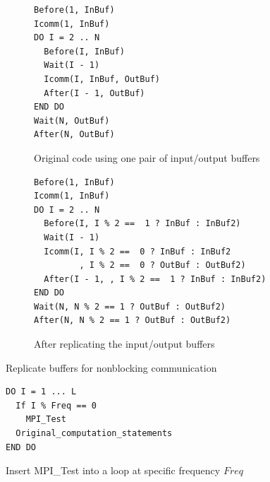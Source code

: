 \begin{figure}
{\scriptsize
  \centering
  \begin{subfigure}[b]{.4\textwidth}
\begin{verbatim}
Before(1, InBuf)
Icomm(1, InBuf)
DO I = 2 .. N
  Before(I, InBuf)
  Wait(I - 1)
  Icomm(I, InBuf, OutBuf)
  After(I - 1, OutBuf)
END DO
Wait(N, OutBuf)
After(N, OutBuf)
\end{verbatim}
    \caption{Original code using one pair of input/output buffers}
    \label{fig:cco:dup:a}
  \end{subfigure}
  \vspace{.01in}
  \begin{subfigure}[b]{.4\textwidth}
\begin{verbatim}
Before(1, InBuf)
Icomm(1, InBuf)
DO I = 2 .. N
  Before(I, I % 2 ==  1 ? InBuf : InBuf2)
  Wait(I - 1)
  Icomm(I, I % 2 ==  0 ? InBuf : InBuf2
         , I % 2 ==  0 ? OutBuf : OutBuf2)
  After(I - 1, , I % 2 ==  1 ? InBuf : InBuf2)
END DO
Wait(N, N % 2 == 1 ? OutBuf : OutBuf2)
After(N, N % 2 == 1 ? OutBuf : OutBuf2)
\end{verbatim}
    \caption{After replicating the input/output buffers}
    \label{fig:cco:dup:b}
  \end{subfigure}
\caption{Replicate buffers for nonblocking communication}
\label{fig:cco:dup}
}
\end{figure}

\begin{figure}[h]
{\scriptsize
\begin{verbatim}
DO I = 1 ... L
  If I % Freq == 0
    MPI_Test
  Original_computation_statements
END DO
\end{verbatim}
}
\caption{Insert MPI\_Test into a loop at specific frequency $Freq$}
\label{fig:cco:test}
\end{figure}

